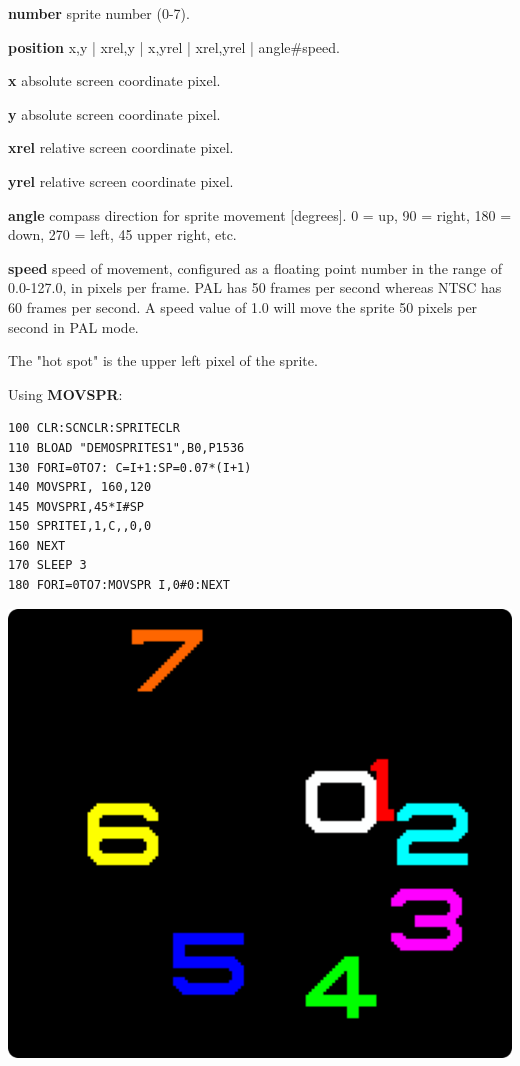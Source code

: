 \begin{description}[leftmargin=2cm,style=nextline]
                {\bf number} sprite number (0-7).

                {\bf position} x,y | xrel,y | x,yrel | xrel,yrel | angle\#speed.

                {\bf x} absolute screen coordinate pixel.

                {\bf y} absolute screen coordinate pixel.

                {\bf xrel} relative screen coordinate pixel.

                {\bf yrel} relative screen coordinate pixel.

                {\bf angle} compass direction for sprite movement [degrees].
                0 = up, 90 = right, 180 = down, 270 = left, 45 upper right, etc.

                {\bf speed} speed of movement, configured as a floating point number in the
                range of 0.0-127.0, in pixels per frame.
                PAL has 50 frames per second whereas NTSC has 60 frames per second.
                A speed value of 1.0 will move the sprite 50 pixels per second
                in PAL mode.


\item [Remarks:] The "hot spot" is the upper left pixel of the sprite.

\item [Example:] Using {\bf MOVSPR}:
\begin{tcolorbox}[colback=black,coltext=white]
\verbatimfont{\codefont}
\begin{verbatim}
100 CLR:SCNCLR:SPRITECLR
110 BLOAD "DEMOSPRITES1",B0,P1536
130 FORI=0TO7: C=I+1:SP=0.07*(I+1)
140 MOVSPRI, 160,120
145 MOVSPRI,45*I#SP
150 SPRITEI,1,C,,0,0
160 NEXT
170 SLEEP 3
180 FORI=0TO7:MOVSPR I,0#0:NEXT
\end{verbatim}
\end{tcolorbox}
\item \begin{center}\includegraphics[width=0.8\linewidth]{images/sprites.png}\end{center}
\end{description}


